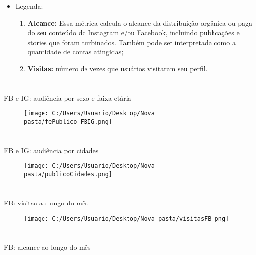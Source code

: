 \documentclass{article}%
\begin{document}
\begin{itemize}%
\item%
Legenda:%
\begin{enumerate}[label=-]%
\item%
\textbf{Alcance:} Essa métrica calcula o alcance da distribuição orgânica ou paga do seu conteúdo do Instagram e/ou Facebook, incluindo publicações e stories que foram turbinados. Também pode ser interpretada como a quantidade de contas atingidas;%
\item%
\textbf{Visitas:} número de vezes que usuários visitaram seu perfil.%
\end{enumerate}%
\end{itemize}

%
\newpage%
\section*{}%
\label{sec:}%
FB e IG: audiência por sexo e faixa etária%


\begin{figure}[H]%
\centering%
\texttt{[image: C:/Users/Usuario/Desktop/Nova pasta/fePublico\_FBIG.png]}%
\end{figure}

%
\section*{}%
\label{sec:}%
FB e IG: audiência por cidades%


\begin{figure}[H]%
\centering%
\texttt{[image: C:/Users/Usuario/Desktop/Nova pasta/publicoCidades.png]}%
\end{figure}

%
\newpage%
\section*{}%
\label{sec:}%
FB: visitas ao longo do mês%


\begin{figure}[H]%
\centering%
\texttt{[image: C:/Users/Usuario/Desktop/Nova pasta/visitasFB.png]}%
\end{figure}

%
\section*{}%
\label{sec:}%
FB: alcance ao longo do mês%
\end{document}
